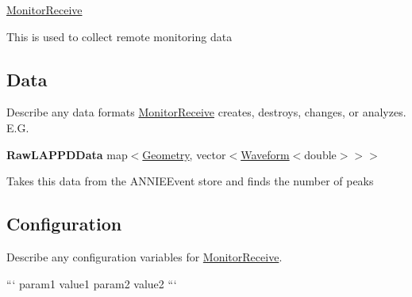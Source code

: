 \hyperlink{classMonitorReceive}{Monitor\-Receive}

This is used to collect remote monitoring data

\subsection*{Data}

Describe any data formats \hyperlink{classMonitorReceive}{Monitor\-Receive} creates, destroys, changes, or analyzes. E.\-G.

{\bfseries Raw\-L\-A\-P\-P\-D\-Data} {\ttfamily map$<$\hyperlink{classGeometry}{Geometry}, vector$<$\hyperlink{classWaveform}{Waveform}$<$double$>$$>$$>$}
\begin{DoxyItemize}
\item Takes this data from the {\ttfamily A\-N\-N\-I\-E\-Event} store and finds the number of peaks
\end{DoxyItemize}

\subsection*{Configuration}

Describe any configuration variables for \hyperlink{classMonitorReceive}{Monitor\-Receive}.

``` param1 value1 param2 value2 ``` 
